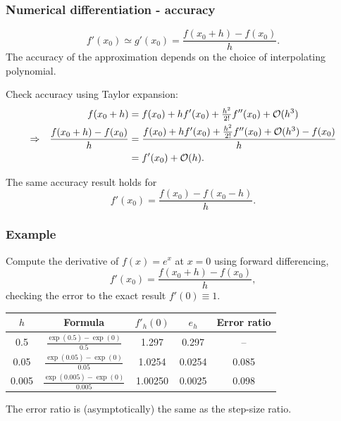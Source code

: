 \documentclass{beamer}
\begin{document}
\begin{frame}
  \frametitle{Numerical differentiation - accuracy}

  \begin{equation*}
    f'(x_0) \simeq g'(x_0) = \frac{f(x_0 + h) - f(x_0)}{h}.
  \end{equation*}
  The accuracy of the approximation depends on the choice of
  interpolating polynomial. \pause

  \vspace{1ex}

  Check accuracy using Taylor expansion:
  \begin{align*}
    && f(x_0 + h) & = f(x_0) + h f'(x_0) + \tfrac{h^2}{2!} f''(x_0) +
    {\cal O}(h^3) \\
    \Rightarrow && \frac{f(x_0 + h) - f(x_0)}{h} & = \frac{f(x_0) + h
      f'(x_0) + \tfrac{h^2}{2!} f''(x_0) + {\cal O}(h^3) - f(x_0)}{h}
    \\
    &&& = f'(x_0) + {\cal O}(h).
  \end{align*} \pause

  \vspace{1ex}

  The same accuracy result holds for
  \begin{equation*}
    f'(x_0) = \frac{f(x_0) - f(x_0 - h)}{h}.
  \end{equation*}

\end{frame}

\begin{frame}
  \frametitle{Example}

  Compute the derivative of $f(x) = e^{x}$ at $x=0$ using forward
  differencing,
  \begin{equation*}
    f'(x_0) = \frac{f(x_0 + h) - f(x_0)}{h},
  \end{equation*}
  checking the error to the exact result $f'(0) \equiv 1$.
  \begin{center}
    \begin{tabular}{c|c c c c}
      $h$ & Formula & $f'_h(0)$ & $e_h$ & Error ratio \\[0.5ex] \hline
      0.5 & \rule{0pt}{1.5em} $\frac{\exp(0.5) - \exp(0)}{0.5}$ & 1.297 & 0.297 & -- \\
      0.05 & \rule{0pt}{1.5em} $\frac{\exp(0.05) - \exp(0)}{0.05}$ & 1.0254 & 0.0254 &
      0.085 \\
      0.005 & \rule{0pt}{1.5em} $\frac{\exp(0.005) - \exp(0)}{0.005}$ & 1.00250 & 0.0025 &
      0.098
    \end{tabular}
  \end{center}

  \vspace{1ex}

  The error ratio is (asymptotically) the same as the step-size ratio.

\end{frame}
\end{document}
